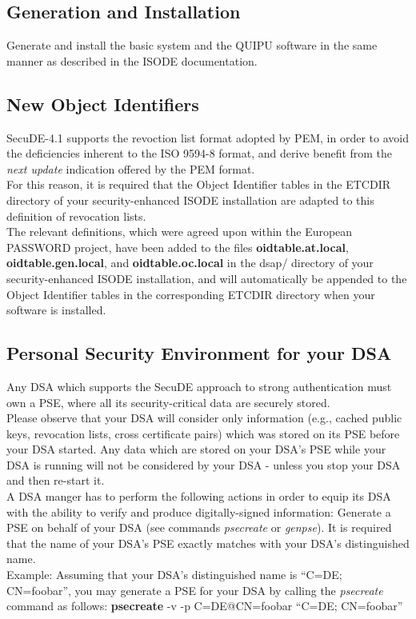 \subsection{Generation and Installation}
Generate and install the basic system and the QUIPU software in the same manner as described in the
ISODE documentation.


\subsection{New Object Identifiers}
SecuDE-4.1 supports the revoction list format adopted 
by PEM, in order to avoid the deficiencies inherent to the ISO 9594-8 format,
and derive benefit from the {\em next update} indication offered by the PEM format. 
\\ [1em]
For this reason, it is required that the Object Identifier tables in the ETCDIR directory
of your security-enhanced ISODE installation are adapted to this definition of revocation lists.
\\ [1em]
The relevant definitions, which were agreed upon within the European PASSWORD project, have been 
added to the files {\bf oidtable.at.local}, 
{\bf oidtable.gen.local}, and {\bf oidtable.oc.local} in the dsap/ directory of your 
security-enhanced ISODE installation, and will automatically be appended to the Object Identifier 
tables in the corresponding ETCDIR directory when your software is
installed. 


\subsection{Personal Security Environment for your DSA}
Any DSA which supports the SecuDE approach to strong authentication
must own a PSE, where all its security-critical data are securely 
stored.
\\ [1em]
Please observe that your DSA will consider only information (e.g., cached
public keys, revocation lists, cross certificate pairs) which was
stored on its PSE before your DSA started. Any data which are stored on your
DSA's PSE while your DSA is running will not be considered by your DSA - unless
you stop your DSA and then re-start it.
\\ [1em]
A DSA manger has to perform the following actions in order to equip
its DSA with the ability to verify and produce digitally-signed 
information:
\be
\m Generate a PSE on behalf of your DSA (see commands {\em psecreate} or {\em genpse}).
   It is required that the name of your DSA's PSE exactly matches with your DSA's distinguished name.
   \\ [1em]
   Example: Assuming that your DSA's distinguished name is ``C=DE; CN=foobar'', you may generate a PSE
   for your DSA by calling the {\em psecreate} command as follows:
   \bvtab
   \1 {\bf psecreate} -v -p C=DE@CN=foobar ``C=DE; CN=foobar''\\
   \evtab


